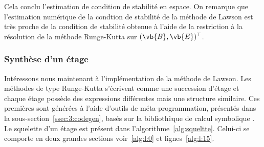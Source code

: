 Cela conclu l'estimation de condition de stabilité en espace. On remarque que l'estimation numérique de la condtion de stabilité de la méthode de Lawson est très proche de la condition de stabilité obtenue à l'aide de la restriction à la résolution de la méthode Runge-Kutta sur $(\vb{B},\vb{E})^\top$.


\subsubsection{Synthèse d'un étage}

Intéressons nous maintenant à l'implémentation de la méthode de Lawson. Les méthodes de type Runge-Kutta s'écrivent comme une succession d'étage et chaque étage possède des expressions différentes mais une structure similaire. Ces premières sont générées à l'aide d'outils de méta-programmation, présentés dans la sous-section~\ref{ssec:3:codegen}, basés sur la bibliothèque \Python{} de calcul symbolique \sympy{}. Le squelette d'un étage est présent dans l'algorithme~\ref{alg:squeltte}. Celui-ci se comporte en deux grandes sections voir~\ref{alg:l:0} et lignes~\ref{alg:l:15}.

